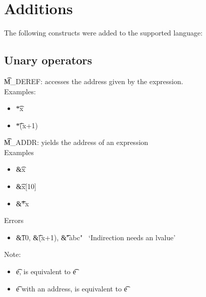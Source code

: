 \section{Additions}

The following constructs were added to the supported language:

\subsection{Unary operators}
\t{M\_DEREF}: accesses the address given by the expression.\\
Examples:
\begin{itemize}
    \item \t{*x} \to\ 
    \item \t{*(x+1)} \to\ 
\end{itemize}

\t{M\_ADDR}: yields the address of an expression\\
Examples
\begin{itemize}
    \item \t{\&x} \to\ 
    \item \t{\&x[10]} \to\ 
    \item \t{\&*x} \to\ 
\end{itemize}
Errors
\begin{itemize}
    \item \t{\&10}, \t{\&(x+1)}, \t{\&"abc"} \to\ `Indirection needs an lvalue'
\end{itemize}

Note:
\begin{itemize}
    \item \forall \t{e},  is equivalent to \t{e}
    \item \forall \t{e} with an address,  is equivalent to \t{e}
\end{itemize}

